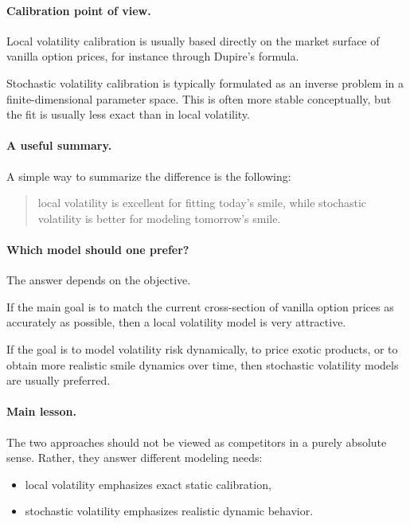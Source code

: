 \documentclass[11pt]{article}
\theoremstyle{plain}
\theoremstyle{definition}
\theoremstyle{remark}
\begin{document}
\paragraph{Calibration point of view.}

Local volatility calibration is usually based directly on the market
surface of vanilla option prices, for instance through Dupire's formula.

Stochastic volatility calibration is typically formulated as an inverse
problem in a finite-dimensional parameter space.
This is often more stable conceptually, but the fit is usually less
exact than in local volatility.

\paragraph{A useful summary.}

A simple way to summarize the difference is the following:
\begin{quote}
local volatility is excellent for fitting today's smile, while
stochastic volatility is better for modeling tomorrow's smile.
\end{quote}

\paragraph{Which model should one prefer?}

The answer depends on the objective.

If the main goal is to match the current cross-section of vanilla option
prices as accurately as possible, then a local volatility model is very
attractive.

If the goal is to model volatility risk dynamically, to price exotic
products, or to obtain more realistic smile dynamics over time, then
stochastic volatility models are usually preferred.

\paragraph{Main lesson.}

The two approaches should not be viewed as competitors in a purely
absolute sense.
Rather, they answer different modeling needs:
\begin{itemize}[leftmargin=1.4em]
    \item local volatility emphasizes exact static calibration,
    \item stochastic volatility emphasizes realistic dynamic behavior.
\end{itemize}
\end{document}
